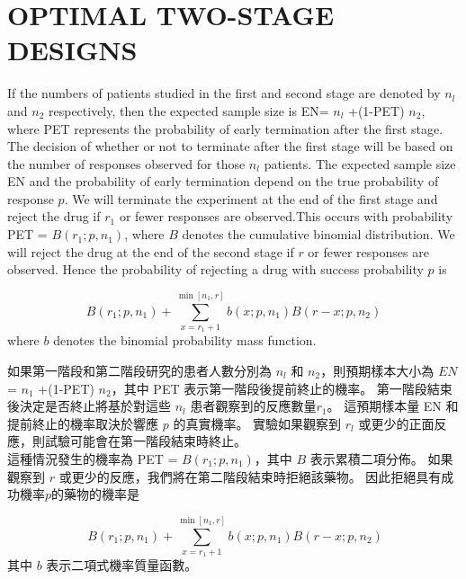 \section{OPTIMAL TWO-STAGE DESIGNS}
	If the numbers of patients studied in the first and second stage are denoted by $n_l$ and $n_2$ respectively, then the expected sample size is EN= $n_l$ +(1-PET) $n_2$, where PET represents the probability of early termination after the first stage. The decision of whether or not to terminate after the first stage will be based on the number of responses observed for those $n_l$ patients. The expected sample size EN and the probability of early termination depend on the true probability of response $p$. We will terminate the experiment at the end of the first stage and reject the drug if $r_1$ or fewer responses are observed.This occurs with probability PET = $B(r_1;p,n_1)$, where $B$ denotes the cumulative binomial distribution. We will reject the drug at the end of the second stage if $r$ or fewer responses are observed. Hence the probability of rejecting a drug with success probability $p$ is 

$$B(r_1;p,n_1)+\sum_{x=r_1+1}^{\min[n_1,r]} b(x;p,n_1)B(r-x;p,n_2)$$ 
where $b$ denotes the binomial probability mass function.


	如果第一階段和第二階段研究的患者人數分別為 $n_l$ 和 $n_2$，則預期樣本大小為 $EN$= $n_1$ +(1-PET) $n_2$，其中 PET 表示第一階段後提前終止的機率。 第一階段結束後決定是否終止將基於對這些 $n_l$ 患者觀察到的反應數量$r_1$。 這預期樣本量 EN 和提前終止的機率取決於響應 $p$ 的真實機率。 實驗如果觀察到 $r_l$ 或更少的正面反應，則試驗可能會在第一階段結束時終止。\\這種情況發生的機率為 PET = $B(r_1;p,n_1)$，其中 $B$ 表示累積二項分佈。 如果觀察到 $r$ 或更少的反應，我們將在第二階段結束時拒絕該藥物。 因此拒絕具有成功機率$p$的藥物的機率是

\begin{equation}
\ B(r_1;p,n_1)+\sum_{x=r_1+1}^{\min[n_1,r]} b(x;p,n_1)B(r-x;p,n_2)\label{eq1}
\end{equation}
其中 $b$ 表示二項式機率質量函數。

